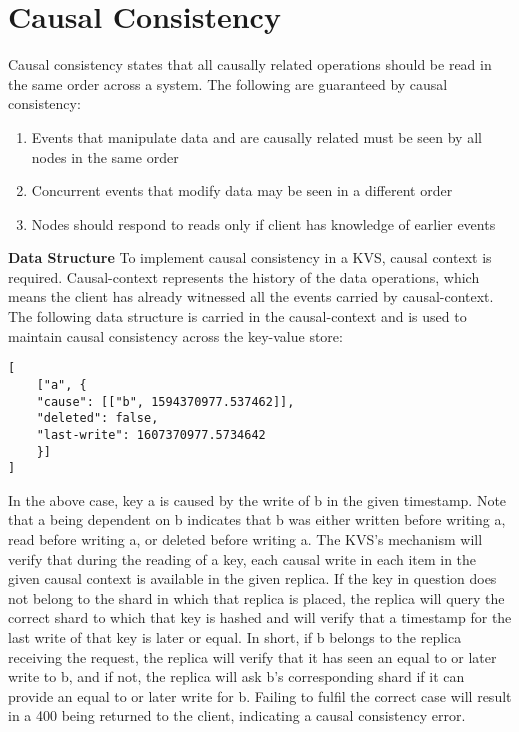 \documentclass[12pt]{article}
\begin{document}
\section{Causal Consistency}
Causal consistency states that all causally related operations should be read in the same order across a system. The following are guaranteed by causal consistency:
\begin{enumerate}
	\item Events that manipulate data and are causally related must be seen by all nodes in the same order
	\item Concurrent events that modify data may be seen in a different order
	\item Nodes should respond to reads only if client has knowledge of earlier events

\end{enumerate}
\textbf{Data Structure}
\newline
To implement causal consistency in a KVS, causal context is required. Causal-context represents the history of the data operations, which means the client has already witnessed all the events carried by causal-context. The following data structure is carried in the causal-context and is used to maintain causal consistency across the key-value store: 
\begin{verbatim}
[
    ["a", {
    "cause": [["b", 1594370977.537462]],
    "deleted": false,
    "last-write": 1607370977.5734642
    }]
]
\end{verbatim}

In the above case, key a is caused by the write of b in the given timestamp. Note that a being dependent on b indicates that b was either written before writing a, read before writing a, or deleted before writing a. The KVS's mechanism will verify that during the reading of a key, each causal write in each item in the given causal context is available in the given replica. If the key in question does not belong to the shard in which that replica is placed, the replica will query the correct shard to which that key is hashed and will verify that a timestamp for the last write of that key is later or equal. In short, if b belongs to the replica receiving the request, the replica will verify that it has seen an equal to or later write to b, and if not, the replica will ask b's corresponding shard if it can provide an equal to or later write for b. Failing to fulfil the correct case will result in a 400 being returned to the client, indicating a causal consistency error.
\end{document}
